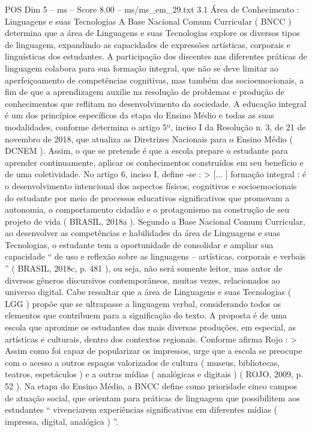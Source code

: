 \begin{textsample}{POS Dim 5 – ms – Score 8.00 – ms/ms\_em\_29.txt}  \label{ex:f5_pos_212}
3.1 Área de Conhecimento : Linguagens e suas Tecnologias A Base Nacional Comum Curricular ( BNCC ) determina que a área de Linguagens e suas Tecnologias explore os diversos tipos de linguagem, expandindo as capacidades de expressões artísticas, corporais e linguísticas dos estudantes.
A participação dos discentes nas diferentes práticas de linguagem colabora para sua formação integral, que não se deve limitar ao aperfeiçoamento de competências cognitivas, mas também das socioemocionais, a fim de que a aprendizagem auxilie na resolução de problemas e produção de conhecimentos que reflitam no desenvolvimento da sociedade.
A educação integral é um dos princípios específicos da etapa do Ensino Médio e todas as suas modalidades, conforme determina o artigo 5º, inciso I da Resolução n. 3, de 21 de novembro de 2018, que atualiza as Diretrizes Nacionais para o Ensino Médio ( DCNEM ).
Assim, o que se pretende é que a escola prepare o estudante para aprender continuamente, aplicar os conhecimentos construídos em seu benefício e de uma coletividade.
No artigo 6, inciso I, define -se : > [... ] formação integral : é o desenvolvimento intencional dos aspectos físicos, cognitivos e socioemocionais do estudante por meio de processos educativos significativos que promovam a autonomia, o comportamento cidadão e o protagonismo na construção de seu projeto de vida ( BRASIL, 2018a ).
Segundo a Base Nacional Comum Curricular, ao desenvolver as competências e habilidades da área de Linguagens e suas Tecnologias, o estudante tem a oportunidade de consolidar e ampliar sua capacidade “ de uso e reflexão sobre as linguagens – artísticas, corporais e verbais ” ( BRASIL, 2018c, p. 481 ), ou seja, não será somente leitor, mas autor de diversos gêneros discursivos contemporâneos, muitas vezes, relacionados ao universo digital.
Cabe ressaltar que a área de Linguagens e suas Tecnologias ( LGG ) propõe que se ultrapasse a linguagem verbal, considerando todos os elementos que contribuem para a significação do texto.
A proposta é de uma escola que aproxime os estudantes das mais diversas produções, em especial, as artísticas e culturais, dentro dos contextos regionais.
Conforme afirma Rojo : > Assim como foi capaz de popularizar os impressos, urge que a escola se preocupe com o acesso a outros espaços valorizados de cultura ( museus, bibliotecas, teatros, espetáculos ) e a outras mídias ( analógicas e digitais ) ( ROJO, 2009, p. 52 ).
Na etapa do Ensino Médio, a BNCC define como prioridade cinco campos de atuação social, que orientam para práticas de linguagem que possibilitem aos estudantes “ vivenciarem experiências significativas em diferentes mídias ( impressa, digital, analógica ) ”.

\end{textsample}
